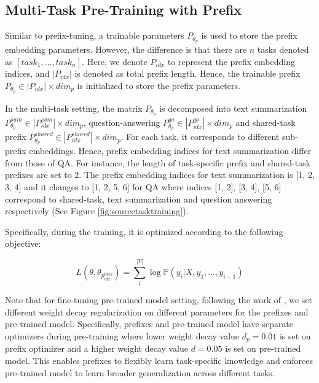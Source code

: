 


\subsection{Multi-Task Pre-Training with Prefix}
Similar to prefix-tuning, a trainable parameters $P_{\theta_{p}}$ is used to store the prefix embedding parameters. However, the difference is that there are $n$ tasks denoted as $[task_{1}, ..., task_{n}] $. Here, we denote $P_{idx}$ to represent the prefix embedding indices, and $|P_{idx}|$ is denoted as total prefix length. Hence, the trainable prefix $P_{\theta_{p}} \in |P_{idx}| \times dim_{p}$ is initialized to store the prefix parameters. 

In the multi-task setting, the matrix $P_{\theta_{p}}$ is decomposed into text summarization  $P_{\theta_{p}}^{sum} \in |P_{idx}^{sum}| \times dim_{p} $, question-answering $P_{\theta_{p}}^{qa} \in |P_{idx}^{qa}| \times dim_{p}$ and shared-task prefix $P_{\theta_{p}}^{shared} \in |P_{idx}^{shared}| \times dim_{p}$. For each task, it corresponds to different sub-prefix embeddings. Hence, prefix embedding indices for text summarization differ from those of QA. For instance, the length of task-specific prefix and shared-task prefixes are set to 2. The prefix embedding indices for text summarization is [1, 2, 3, 4] and it changes to [1, 2, 5, 6] for QA where indices [1, 2], [3, 4], [5, 6] correspond to shared-task, text summarization and question answering respectively (See Figure \ref{fig:sourcetasktraining}).

Specifically, during the training, it is optimized according to the following objective:

\begin{equation}
L(\theta , \theta_{p_{idx}^{task}}) = \sum_{i}^{|Y|} \log \mathbb{P}(y_{i} | X, y_{1}, ..., y_{i-1}) 
\end{equation}

Note that for fine-tuning pre-trained model setting, following the work of \citet{chen2023unisumm}, we set different weight decay regularization on different parameters for the prefixes and pre-trained model. Specifically, prefixes and pre-trained model have separate optimizers during pre-training where lower weight decay value $d_{p} = 0.01$ is set on prefix optimizer and a higher weight decay value $d = 0.05$ is set on pre-trained model. This enables prefixes to flexibly learn task-specific knowledge and enforces pre-trained model to learn broader generalization across different tasks. 

